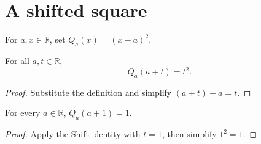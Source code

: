 \section{A shifted square}

\begin{definition}\label{def:demo-shifted-square}
For $a,x\in\mathbb{R}$, set $Q_a(x)=(x-a)^2$.
\end{definition}

\begin{lemma}\label{lem:demo-shift-identity}
For all $a,t\in\mathbb{R}$,
\[
  Q_a(a+t)=t^2.
\]
\end{lemma}
\begin{proof}
Substitute the definition and simplify $(a+t)-a=t$.
\end{proof}

\begin{theorem}\label{thm:demo-shift-one}
For every $a\in\mathbb{R}$, $Q_a(a+1)=1$.
\end{theorem}
\begin{proof}
Apply the Shift identity with $t=1$, then simplify $1^2=1$.
\end{proof}

